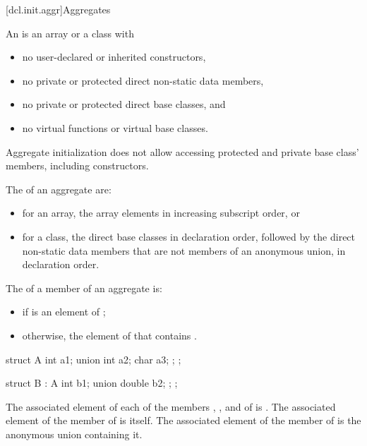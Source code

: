 [dcl.init.aggr]{Aggregates}%
%
%
%
%
%
%

\pnum
An  is an array or a class with
\begin{itemize}
\item
no user-declared or inherited constructors,
\item
no private or protected direct non-static data members,
\item
no private or protected direct base classes, and
\item
no virtual functions or virtual base classes.
\end{itemize}
\begin{note}
Aggregate initialization does not allow accessing
protected and private base class' members, including constructors.
\end{note}

\pnum
The  of an aggregate are:
\begin{itemize}
\item
for an array, the array elements in increasing subscript order, or
\item
for a class, the direct base classes in declaration order,
followed by the direct non-static data members
that are not members of an anonymous union, in declaration order.
\end{itemize}

\pnum
The  of a member 
of an aggregate  is:
\begin{itemize}
\item {} if  is an element of ;
\item otherwise, the element of  that contains .
\end{itemize}
\begin{example}
\begin{codeblock}
struct A {
  int a1;
  union {
    int a2;
    char a3;
  };
};

struct B : A {
  int b1;
  union {
    double b2;
  };
};
\end{codeblock}
The associated element of each of
the members , , and 
of  is .
The associated element of the member  of  is itself.
The associated element of the member  of  is
the anonymous union containing it.
\end{example}

